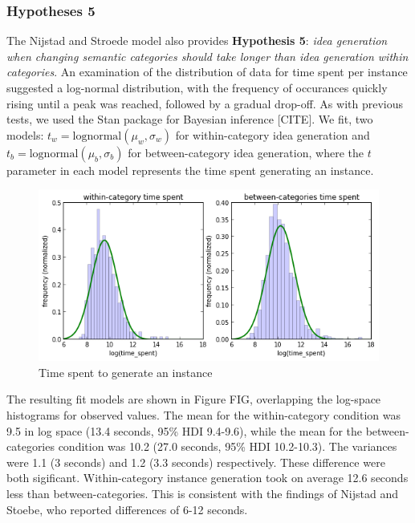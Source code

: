 \subsubsection{Hypotheses 5}

The Nijstad and Stroede \cite{nijstad_how_2006} model also provides \textbf{Hypothesis 5}: \emph{idea generation when changing semantic categories should take longer than idea generation within categories}. An examination of the distribution of data for time spent per instance suggested a log-normal distribution, with the frequency of occurances quickly rising until a peak was reached, followed by a gradual drop-off. As with previous tests, we used the Stan package for Bayesian inference [CITE]. We fit, two models: $t_w = \text{lognormal}(\mu_w, \sigma_w)$ for within-category idea generation and $t_b = \text{lognormal}(\mu_b, \sigma_b)$ for between-category idea generation, where the $t$ parameter in each model represents the time spent generating an instance.

\begin{figure}[h]
    \centering
    \includegraphics[width=0.9\columnwidth]{hyp5_comparison}
    \caption{Time spent to generate an instance}
\end{figure}

The resulting fit models are shown in Figure FIG, overlapping the log-space histograms for observed values. The mean for the within-category condition was 9.5 in log space (13.4 seconds, 95\% HDI 9.4-9.6), while the mean for the between-categories condition was 10.2 (27.0 seconds, 95\% HDI 10.2-10.3). The variances were 1.1 (3 seconds) and 1.2 (3.3 seconds) respectively. These difference were both sigificant. Within-category instance generation took on average 12.6 seconds less than between-categories. This is consistent with the findings of Nijstad and Stoebe, who reported differences of 6-12 seconds.
